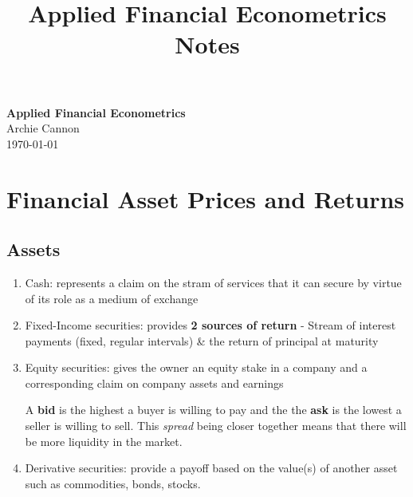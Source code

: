 \documentclass[11pt]{article}
\begin{document}
\title{Applied Financial Econometrics Notes}

\thispagestyle{empty}

\begin{center}
{\LARGE \bf Applied Financial Econometrics}\\
{\large Archie Cannon}\\
\today
\end{center}

{
\begin{tcolorbox}[title=Contents, fonttitle=\huge\sffamily\bfseries\selectfont,interior style={left color=contcol1!40!white,right color=contcol2!40!white},frame style={left color=contcol1!80!white,right color=contcol2!80!white},coltitle=black,top=2mm,bottom=2mm,left=2mm,right=2mm,drop fuzzy shadow,enhanced,breakable]
\makeatletter
{}
\makeatother
\end{tcolorbox}}

\newpage

\section{Financial Asset Prices and Returns}

\subsection{Assets}

\begin{enumerate}
    \item Cash: represents a claim on the stram of services that it can secure by virtue of its role as a medium of exchange
    \item Fixed-Income securities: provides \textbf{2 sources of return} - Stream of interest payments (fixed, regular intervals) \& the return of principal at maturity
    \item Equity securities: gives the owner an equity stake in a company and a corresponding claim on company assets and earnings
    \begin{note}
    A \textbf{bid} is the highest a buyer is willing to pay and the the \textbf{ask} is the lowest a seller is willing to sell. This \textit{spread} being closer together means that there will be more liquidity in the market.
    \end{note}
    \item Derivative securities: provide a payoff based on the value(s) of another asset such as commodities, bonds, stocks.
\end{enumerate}
\end{document}
